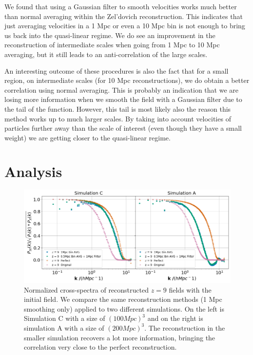 We found that using a Gaussian filter to smooth velocities works much better than normal averaging within the Zel'dovich reconstruction. This indicates that just averaging velocities in a 1 Mpc or even a 10 Mpc bin is not enough to bring us back into the quasi-linear regime. We do see an improvement in the reconstruction of intermediate scales when going from 1 Mpc to 10 Mpc averaging, but it still leads to an anti-correlation of the large scales.

An interesting outcome of these procedures is also the fact that for a small region, on intermediate scales (for 10 Mpc reconstructions), we do obtain a better correlation using normal averaging. This is probably an indication that we are losing more information when we smooth the field with a Gaussian filter due to the tail of the function. However, this tail is most likely also the reason this method works up to much larger scales. By taking into account velocities of particles further away than the scale of interest (even though they have a small weight) we are getting closer to the quasi-linear regime. 

\section{Analysis}

\begin{figure}
    \centering
    \includegraphics[width=1\columnwidth]{images/realRecon/z9SimComp.png}%
    
    \caption{
        Normalized cross-spectra of reconstructed $z=9$ fields with the initial field. We compare the same reconstruction methods (1 Mpc smoothing only) applied to two different simulations. On the left is Simulation C with a size of $(100 Mpc)^3$ and on the right is simulation A with a size of $(200 Mpc)^3$. The reconstruction in the smaller simulation recovers a lot more information, bringing the correlation very close to the perfect reconstruction.
        }
        
        \label{fig:4.4}
    \end{figure}
    
